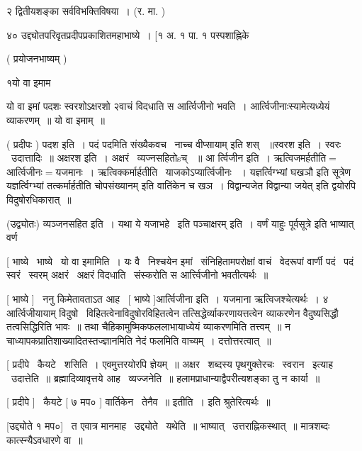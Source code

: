 \documentclass[11pt, openany]{book}
\begin{document}
२ द्वितीयशङ्का सर्वविभक्तिविषया~। (र. मा. ) 

४० उद्द्योतपरिवृतप्रदीपप्रकाशितमहाभाष्ये~। [१ अ. १ पा. १
पस्पशाह्निके



 ( प्रयोजनभाष्यम् ) 

१यो वा इमाम \textendash\ 

 {\qt यो वा इमां पदशः स्वरशोऽक्षरशो २वाचं विदधाति स आर्त्विजीनो
भवति~। आर्त्विजीनाःस्यामेत्यध्येयं व्याकरणम्~॥ यो वा इमाम्~॥}

 ( प्रदीपः ) पदश इति~। पदं पदमिति {\qt संख्यैकवच} \textendash\ नाच्च वीप्सायाम् इति शस्
~॥स्वरश इति~। स्वरः \textendash\ उदात्तादिः~॥ अक्षरश इति~। अक्षरं \textendash\ व्यज्नसहितोsच्
~॥ आ र्त्विजीन इति~। 
ऋत्विजमर्हतीति$=$आर्त्विजीनः$=$यजमानः~। ऋत्विक्कर्मार्हतीति \textendash\ याजकोऽप्यार्त्विजीनः
~। {\qt यज्ञर्त्विग्भ्यां घखञौ} इति सूत्रेण {\qt यज्ञर्त्विग्भ्यां
तत्कर्मार्हतीति चोपसंख्यानम्} इति वातिंकेन च खञ~। {\qt विद्वान्यजेत
विद्वान्या जयेत्} इति द्वयोरपि विदुषोरधिकारात्~॥ 

 (उद्व्योतः) व्यञ्जनसहित इति~। यथा {\qt ये यजाभहे \textendash\ इति पञ्चाक्षरम्} इति~। 
{\qt वर्णं याहुः} पूर्वसूत्रे इति भाष्यात् वर्ण



 [ भाष्ये \textendash\ भाष्ये \textendash\ यो वा इमामिति~। यः वै \textendash\ निश्चयेन
इमां \textendash\ संनिहितामपरोक्षां वाचं \textendash\ वेदरूपां वार्णी पदं \textendash\ पदं स्वरं \textendash\ स्वरम्
अक्षरं \textendash\ अक्षरं विदधाति \textendash\ संस्करोति स आर्त्त्विजीनो भवतीत्यर्थः~॥ 

 [ भाष्ये ] \textendash\ ननु किमेतावताऽत आह \textendash\ [ भाष्ये ]आर्त्विजीना इति~। 
यजमाना ऋत्विजश्चेत्यर्थः~। ४ आर्त्विजीयायाम्
विदुषो \textendash\ विहितत्वेनाविदुषोरविहितत्वेन तत्सिद्धेर्व्याकरणायत्तत्वेन
व्याकरणेन वैदुष्यसिद्धौ तत्वसिद्धिरिति भावः~॥ तथा
चैहिकामुष्मिकफललाभायाध्येयं व्याकरणमिति तत्त्वम्~॥ न
चाध्यापकप्रातिशाख्यादितस्तज्ज्ञानमिति नेदं फलमिति वाच्यम्~। 
दत्तोत्तरत्वात्~॥ 

 [ प्रदीपे \textendash\ कैयटे \textendash\ शसिति~। एवमुत्तरयोरपि ज्ञेयम्~॥ अक्षर \textendash\ शब्दस्य
पृथगुक्तेरचः \textendash\ स्वरान \textendash\ इत्याह \textendash\ उदात्तेति~॥ ब्रह्मादिव्यावृत्तये
आह \textendash\ व्यज्जनेति~॥ हलामप्राधान्याद्वैपरीत्यशङ्का तु न कार्या~॥ 

 [ प्रदीपे ] \textendash\ कैयटे [ ७ मप० ] वार्तिकेन \textendash\ तेनैव~॥ इतीति~। इति
श्रुतेरित्यर्थः~॥ 

 [उद्द्योते १ मप०] \textendash\ त एवात्र मानमाह \textendash\ उद्द्योते \textendash\ यथेति~॥
भाष्यात् \textendash\ उत्तराह्निकस्थात्~॥ मात्रशब्दः कात्स्न्यैऽवधारणे वा~॥ 
\end{document}

